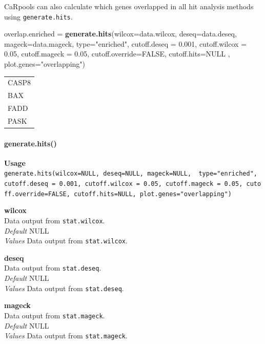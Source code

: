 \documentclass[]{article}
\newenvironment{Shaded}{\begin{snugshade}}{\end{snugshade}}
\newcommand{\KeywordTok}[1]{\textcolor[rgb]{0.13,0.29,0.53}{\textbf{{#1}}}}
\newcommand{\DataTypeTok}[1]{\textcolor[rgb]{0.13,0.29,0.53}{{#1}}}
\newcommand{\FloatTok}[1]{\textcolor[rgb]{0.00,0.00,0.81}{{#1}}}
\newcommand{\StringTok}[1]{\textcolor[rgb]{0.31,0.60,0.02}{{#1}}}
\newcommand{\OtherTok}[1]{\textcolor[rgb]{0.56,0.35,0.01}{{#1}}}
\newcommand{\NormalTok}[1]{{#1}}
\let\oldparagraph\paragraph
\renewcommand{\paragraph}[1]{\oldparagraph{#1}\mbox{}}
\begin{document}
CaRpools can also calculate which genes overlapped in all hit analysis
methods using \texttt{generate.hits}.

\begin{Shaded}
\begin{Highlighting}[]
\NormalTok{overlap.enriched =}\StringTok{ }\KeywordTok{generate.hits}\NormalTok{(}\DataTypeTok{wilcox=}\NormalTok{data.wilcox, }\DataTypeTok{deseq=}\NormalTok{data.deseq, }\DataTypeTok{mageck=}\NormalTok{data.mageck, }\DataTypeTok{type=}\StringTok{"enriched"}\NormalTok{, }\DataTypeTok{cutoff.deseq =} \FloatTok{0.001}\NormalTok{, }\DataTypeTok{cutoff.wilcox =} \FloatTok{0.05}\NormalTok{, }\DataTypeTok{cutoff.mageck =} \FloatTok{0.05}\NormalTok{, }\DataTypeTok{cutoff.override=}\OtherTok{FALSE}\NormalTok{, }\DataTypeTok{cutoff.hits=}\OtherTok{NULL} \NormalTok{, }\DataTypeTok{plot.genes=}\StringTok{"overlapping"}\NormalTok{)}
\end{Highlighting}
\end{Shaded}

\begin{longtable}[c]{@{}l@{}}
\toprule
CASP8\tabularnewline
BAX\tabularnewline
FADD\tabularnewline
PASK\tabularnewline
\bottomrule
\end{longtable}

\paragraph{generate.hits()}\label{generate.hits}

\textbf{Usage}\\
\texttt{generate.hits(wilcox=NULL,\ deseq=NULL,\ mageck=NULL,\ \ type="enriched",\ cutoff.deseq\ =\ 0.001,\ cutoff.wilcox\ =\ 0.05,\ cutoff.mageck\ =\ 0.05,\ cutoff.override=FALSE,\ cutoff.hits=NULL,\ plot.genes="overlapping")}

\textbf{wilcox}\\
Data output from \texttt{stat.wilcox}.\\
\emph{Default} NULL\\
\emph{Values} Data output from \texttt{stat.wilcox}.

\textbf{deseq}\\
Data output from \texttt{stat.deseq}.\\
\emph{Default} NULL\\
\emph{Values} Data output from \texttt{stat.deseq}.

\textbf{mageck}\\
Data output from \texttt{stat.mageck}.\\
\emph{Default} NULL\\
\emph{Values} Data output from \texttt{stat.mageck}.
\end{document}
